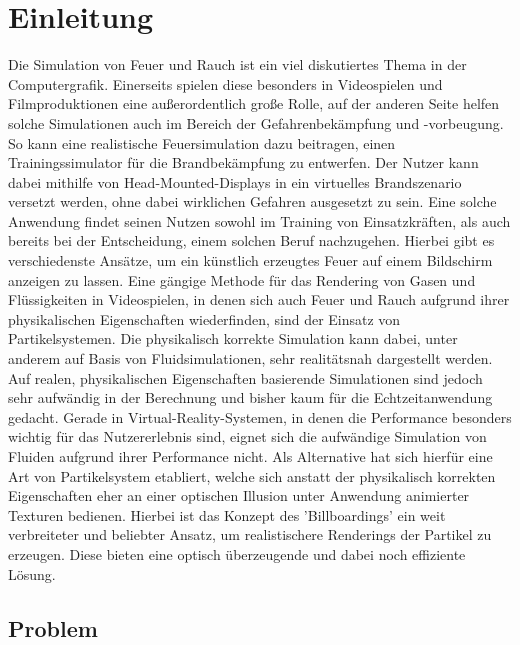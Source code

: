 \section{Einleitung}
\noindent

Die Simulation von Feuer und Rauch ist ein viel diskutiertes Thema in der Computergrafik. Einerseits
spielen diese besonders in Videospielen und Filmproduktionen eine außerordentlich große Rolle, auf der
anderen Seite helfen solche Simulationen auch im Bereich der Gefahrenbekämpfung und -vorbeugung.
So kann eine realistische Feuersimulation dazu beitragen, einen Trainingssimulator für die Brandbekämpfung  \parencite{Schlager2017}
zu entwerfen. Der Nutzer kann dabei mithilfe von Head-Mounted-Displays in ein virtuelles Brandszenario versetzt werden,
ohne dabei wirklichen Gefahren ausgesetzt zu sein. Eine solche Anwendung findet seinen Nutzen sowohl im Training
von Einsatzkräften, als auch bereits bei der Entscheidung, einem solchen Beruf nachzugehen.
Hierbei gibt es verschiedenste Ansätze, um ein künstlich erzeugtes Feuer auf einem
Bildschirm anzeigen zu lassen. Eine gängige Methode für das Rendering von Gasen und Flüssigkeiten
in Videospielen, in denen sich auch Feuer und Rauch aufgrund ihrer physikalischen Eigenschaften
wiederfinden, sind der Einsatz von Partikelsystemen. Die physikalisch korrekte Simulation kann dabei,
unter anderem auf Basis von Fluidsimulationen, sehr realitätsnah dargestellt werden.
Auf realen, physikalischen Eigenschaften basierende Simulationen sind jedoch sehr aufwändig in der
Berechnung und bisher kaum für die Echtzeitanwendung gedacht.
Gerade in Virtual-Reality-Systemen, in denen die Performance besonders wichtig für das Nutzererlebnis sind,
eignet sich die aufwändige Simulation von Fluiden aufgrund ihrer Performance nicht. Als Alternative hat
sich hierfür eine Art von Partikelsystem etabliert, welche sich anstatt der physikalisch korrekten
Eigenschaften eher an einer optischen Illusion unter Anwendung animierter Texturen bedienen.
Hierbei ist das Konzept des 'Billboardings' ein weit verbreiteter und beliebter Ansatz,
um realistischere Renderings der Partikel zu erzeugen. Diese bieten eine optisch überzeugende und
dabei noch effiziente Lösung.



\subsection{Problem}

